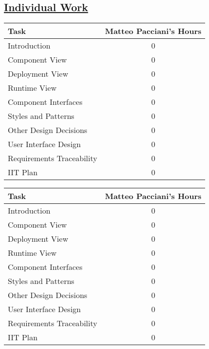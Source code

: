 \subsection[Individual Work]{\hyperlink{toc}{Individual Work}}
\vspace{2mm}
\begin{center}
	\begin{tabular}{| l | c |}
	\hline
	\textbf{Task} & \textbf{Matteo Pacciani's Hours} \\ \hline
	Introduction & 0 \\ \hline
	Component View & 0 \\ \hline
	Deployment View & 0 \\ \hline
	Runtime View & 0 \\ \hline
	Component Interfaces & 0 \\ \hline
	Styles and Patterns & 0 \\ \hline
	Other Design Decisions & 0 \\ \hline
	User Interface Design & 0 \\ \hline
	Requirements Traceability & 0 \\ \hline
	IIT Plan & 0 \\
	\hline	
	\end{tabular}
	
	\vspace{2mm}
	
	\begin{tabular}{| l | c |}
	\hline
	\textbf{Task} & \textbf{Matteo Pacciani's Hours} \\ \hline
	Introduction & 0 \\ \hline
	Component View & 0 \\ \hline
	Deployment View & 0 \\ \hline
	Runtime View & 0 \\ \hline
	Component Interfaces & 0 \\ \hline
	Styles and Patterns & 0 \\ \hline
	Other Design Decisions & 0 \\ \hline
	User Interface Design & 0 \\ \hline
	Requirements Traceability & 0 \\ \hline
	IIT Plan & 0 \\
	\hline
	\end{tabular}
\end{center}